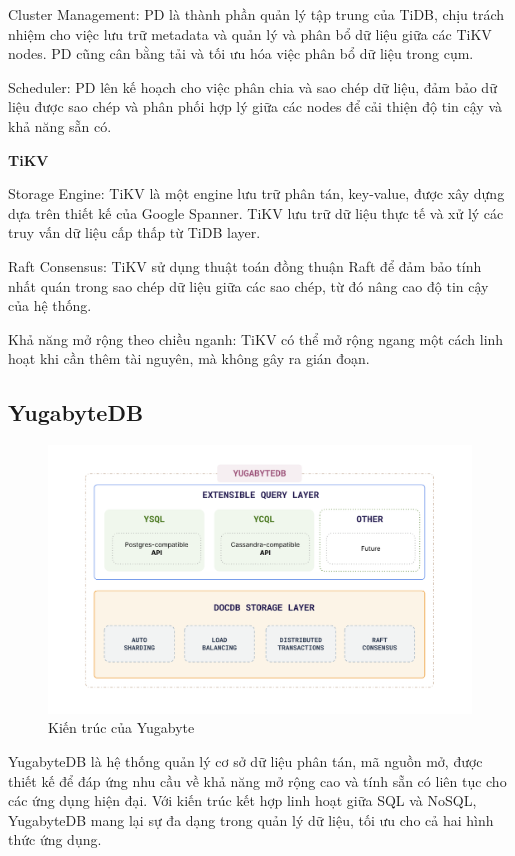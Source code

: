 \documentclass{article}[14pt]
\begin{document}
Cluster Management: PD là thành phần quản lý tập trung của TiDB, chịu trách nhiệm cho việc lưu trữ metadata và quản lý và phân bổ dữ liệu giữa các TiKV nodes. PD cũng cân bằng tải và tối ưu hóa việc phân bổ dữ liệu trong cụm.

Scheduler: PD lên kế hoạch cho việc phân chia và sao chép dữ liệu, đảm bảo dữ liệu được sao chép và phân phối hợp lý giữa các nodes để cải thiện độ tin cậy và khả năng sẵn có.


\textbf{TiKV}

Storage Engine: TiKV là một engine lưu trữ phân tán, key-value, được xây dựng dựa trên thiết kế của Google Spanner. TiKV lưu trữ dữ liệu thực tế và xử lý các truy vấn dữ liệu cấp thấp từ TiDB layer.

Raft Consensus: TiKV sử dụng thuật toán đồng thuận Raft để đảm bảo tính nhất quán trong sao chép dữ liệu giữa các sao chép, từ đó nâng cao độ tin cậy của hệ thống.

Khả năng mở rộng theo chiều nganh: TiKV có thể mở rộng ngang một cách linh hoạt khi cần thêm tài nguyên, mà không gây ra gián đoạn.

\subsection{YugabyteDB}

\begin{figure}
    \centering
    \includegraphics[width=0.6\linewidth]{images/YugaArchitecture.png}
    \caption{Kiến trúc của Yugabyte \protect\footnotemark}
    \label{fig:YugaArchitecture}
\end{figure}



YugabyteDB là hệ thống quản lý cơ sở dữ liệu phân tán, mã nguồn mở, được thiết kế để đáp ứng nhu cầu về khả năng mở rộng cao và tính sẵn có liên tục cho các ứng dụng hiện đại. Với kiến trúc kết hợp linh hoạt giữa SQL và NoSQL, YugabyteDB mang lại sự đa dạng trong quản lý dữ liệu, tối ưu cho cả hai hình thức ứng dụng.
\end{document}
